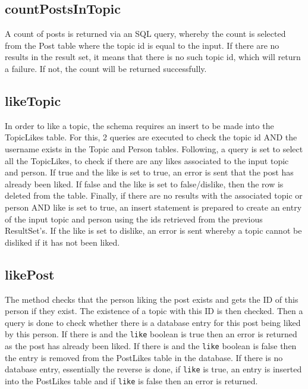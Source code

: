\documentclass{article}
\begin{document}
\subsection*{countPostsInTopic}

A count of posts is returned via an SQL query, whereby the count is selected from the Post table where the topic id is equal to the input. If there are no results in the result set, it means that there is no such topic id, which will return a failure. If not, the count will be returned successfully.

\subsection*{likeTopic}

In order to like a topic, the schema requires an insert to be made into the TopicLikes table. For this, 2 queries are executed to check the topic id AND the username exists in the Topic and Person tables. Following, a query is set to select all the TopicLikes, to check if there are any likes associated to the input topic and person. If true and the like is set to true, an error is sent that the post has already been liked. If false and the like is set to false/dislike, then the row is deleted from the table.
Finally, if there are no results with the associated topic or person AND like is set to true, an insert statement is prepared to create an entry of the input topic and person using the ids retrieved from the previous ResultSet’s. If the like is set to dislike, an error is sent whereby a topic cannot be disliked if it has not been liked.

\subsection*{likePost}

The method checks that the person liking the post exists and gets the ID of this person if they exist. The existence of a topic with this ID is then checked. Then a query is done to check whether there is a database entry for this post being liked by this person. If there is and the \texttt{like} boolean is true then an error is returned as the post has already been liked. If there is and the \texttt{like} boolean is false then the entry is removed from the PostLikes table in the database. If there is no database entry, essentially the reverse is done, if \texttt{like} is true, an entry is inserted into the PostLikes table and if \texttt{like} is false then an error is returned.
\end{document}
